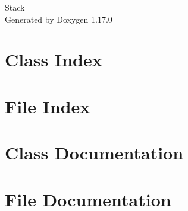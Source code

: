 \documentclass[twoside]{book}
\newcommand{\+}{\discretionary{\mbox{\scriptsize$\hookleftarrow$}}{}{}}
\newcommand{\clearemptydoublepage}{%
    \newpage{\pagestyle{empty}\cleardoublepage}%
  }
\begin{document}
  \raggedbottom
    \hypersetup{pageanchor=false,
                bookmarksnumbered=true,
                pdfencoding=unicode
               }
  \begin{titlepage}
  \vspace*{7cm}
  \begin{center}%
  {\Large Stack}\\
  \vspace*{1cm}
  {\large Generated by Doxygen 1.17.0}\\
  \end{center}
  \end{titlepage}
  \clearemptydoublepage
  \tableofcontents
  \clearemptydoublepage
  \hypersetup{pageanchor=true}
\chapter{Class Index}

\chapter{File Index}

\chapter{Class Documentation}

\chapter{File Documentation}



  \backmatter
  \newpage
  \clearemptydoublepage
  \printindex
\end{document}
